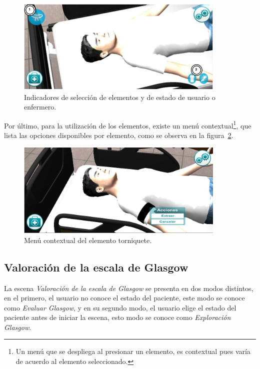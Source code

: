 \begin{figure}[H]
\centering
\includegraphics[width=10cm]{solucion/images/hemocultivo_seleccion.jpg}
\caption{Indicadores de selección de elementos y de estado de usuario o enfermero.}
\label{fig:hemocultivo_seleccion}
\end{figure}



Por último, para la utilización de los elementos, existe un menú
contextual\footnote{Un menú que se despliega al presionar un elemento, es
    contextual pues varía de acuerdo al elemento seleccionado.}, que lista las
opciones disponibles por elemento, como se observa en la
figura~\ref{fig:hemocultivo_torniquete_cm}.

\begin{figure}[H]
\centering
\includegraphics[width=10cm]{solucion/images/hemocultivo_contextual.jpg}
\caption{Menú contextual del elemento torniquete.}
\label{fig:hemocultivo_torniquete_cm}
\end{figure}

\subsection{Valoración de la escala de Glasgow}

La escena \emph{Valoración de la escala de Glasgow} se presenta en dos modos
distintos, en el primero, el usuario no conoce el estado del paciente, este modo
se conoce como \emph{Evaluar Glasgow}, y en su segundo modo, el usuario elige el
estado del paciente antes de iniciar la escena, esto modo se conoce como
\emph{Exploración Glasgow}. 

